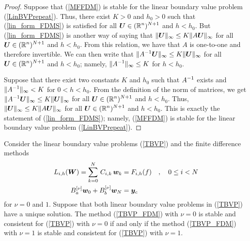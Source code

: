 \begin{proof}
 Suppose that (\ref{MFFDM}) is stable for the linear boundary
value problem  (\ref{LinBVPrepeat}).   Thus, there exist $K>0$ and
$h_0 >0$ such that (\ref{lin_form_FDMS}) is 
satisfied for all $\displaystyle \bm{U} \in (\mathbb{R}^n)^{N+1}$ and $h < h_0$.  But
(\ref{lin_form_FDMS}) is another way of saying that
$\| \bm{U} \|_\infty \leq K \| A \bm{U}\|_\infty$ for all
$\displaystyle \bm{U} \in (\mathbb{R}^n)^{N+1}$ and $h < h_0$.   From this
relation, we have that $A$ is one-to-one and therefore invertible.  We can then
write that $\displaystyle \| A^{-1} \bm{U} \|_\infty \leq K \|\bm{U} \|_\infty$
for all $\displaystyle \bm{U} \in (\mathbb{R}^n)^{N+1}$ and $h < h_0$; namely,
$\displaystyle \| A^{-1} \|_\infty \leq K$ for $h < h_0$.

 Suppose that there exist two constants $K$ and $h_0$ such
that $\displaystyle A^{-1}$ exists and
$\displaystyle \| A^{-1} \|_\infty < K$ for
$0<h < h_0$.  From the definition of the norm of matrices, we get
$\displaystyle \| A^{-1} \bm{U} \|_\infty \leq K \|\bm{U} \|_\infty$ for all
$\displaystyle \bm{U} \in (\mathbb{R}^n)^{N+1}$ and $h < h_0$.  Thus,
$\|\bm{U} \|_\infty \leq K \| A \bm{U} \|_\infty$ for all
$\displaystyle \bm{U} \in (\mathbb{R}^n)^{N+1}$ and $h < h_0$.  This is
exactly the statement of (\ref{lin_form_FDMS}); namely, (\ref{MFFDM})
is stable for the linear boundary value problem  (\ref{LinBVPrepeat}).
\end{proof}

\begin{theorem}
Consider the linear boundary value problems (\ref{TBVP}) and the finite
difference methods
\begin{equation} \label{TBVP_FDM}
\begin{split}
L_{i,h}(\bm{W}) = \sum_{k=0}^N\,C_{i,k}\,\bm{w}_k
& = F_{i,h}(f) \quad , \quad 0 \leq i < N \\
B_a^{[\nu]}\bm{w}_0 + B_b^{[\nu]}\bm{w}_N &= \bm{y}_c
\end{split}
\end{equation}
for $\nu=0$ and $1$.  Suppose that both linear boundary value problems
in (\ref{TBVP}) have a unique solution.  The method (\ref{TBVP_FDM})
with $\nu=0$ is stable and consistent for (\ref{TBVP}) with $\nu=0$ if
and only if the method (\ref{TBVP_FDM}) with $\nu=1$ is stable and
consistent for (\ref{TBVP}) with $\nu=1$.
\label{Equ_0and1}
\end{theorem}

